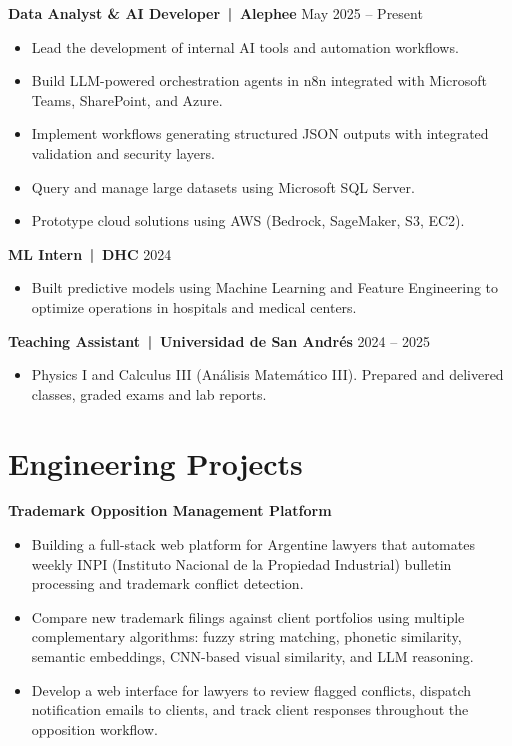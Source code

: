 \documentclass[a4paper,11pt]{article}
\begin{document}
\textbf{Data Analyst \& AI Developer \,|\, Alephee} \hfill May 2025 -- Present
\begin{itemize}
    \item Lead the development of internal AI tools and automation workflows.
    \item Build LLM-powered orchestration agents in n8n integrated with Microsoft Teams, SharePoint, and Azure.
    \item Implement workflows generating structured JSON outputs with integrated validation and security layers.
    \item Query and manage large datasets using Microsoft SQL Server.
    \item Prototype cloud solutions using AWS (Bedrock, SageMaker, S3, EC2).
\end{itemize}

\textbf{ML Intern \,|\, DHC} \hfill 2024
\begin{itemize}
    \item Built predictive models using Machine Learning and Feature Engineering to optimize operations in hospitals and medical centers.
\end{itemize}

\textbf{Teaching Assistant \,|\, Universidad de San Andrés} \hfill 2024 -- 2025
\begin{itemize}
    \item Physics I and Calculus III (Análisis Matemático III). Prepared and delivered classes, graded exams and lab reports.
\end{itemize}

\section*{Engineering Projects}

\textbf{Trademark Opposition Management Platform}
\begin{itemize}
    \item Building a full-stack web platform for Argentine lawyers that automates weekly INPI (Instituto Nacional de la Propiedad Industrial) bulletin processing and trademark conflict detection.
    \item Compare new trademark filings against client portfolios using multiple complementary algorithms: fuzzy string matching, phonetic similarity, semantic embeddings, CNN-based visual similarity, and LLM reasoning.
    \item Develop a web interface for lawyers to review flagged conflicts, dispatch notification emails to clients, and track client responses throughout the opposition workflow.
\end{itemize}
\end{document}
